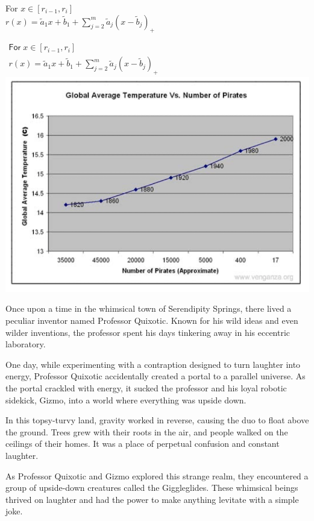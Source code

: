 \documentclass[10pt]{article}
\begin{document}
\begin{multicols*}{4}
For $x \in[r_{i-1},r_{i}]$ \\
$r(x)={\tilde{a}}_{1}x+{\tilde{b}}_{1}+\sum_{j=2}^{m}{\tilde{a}}_{j}(x-{\tilde{b}}_{j})_{+}$

\hrulefill

$\begin{array}{l}{{\mathsf{For}\;x\in[r_{i-1},r_{i}]}}\\ {{r(x)={\tilde{a}}_{1}x+{\tilde{b}}_{1}+\sum_{j=2}^{m}{\tilde{a}}_{j}(x-{\tilde{b}}_{j})_{+}}}\end{array}$\\
\includegraphics[width=\linewidth]{test_image}

Once upon a time in the whimsical town of Serendipity Springs, there lived a peculiar inventor named Professor Quixotic. Known for his wild ideas and even wilder inventions, the professor spent his days tinkering away in his eccentric laboratory.

\noindent\dotfill

One day, while experimenting with a contraption designed to turn laughter into energy, Professor Quixotic accidentally created a portal to a parallel universe. As the portal crackled with energy, it sucked the professor and his loyal robotic sidekick, Gizmo, into a world where everything was upside down.

In this topsy-turvy land, gravity worked in reverse, causing the duo to float above the ground. Trees grew with their roots in the air, and people walked on the ceilings of their homes. It was a place of perpetual confusion and constant laughter.

As Professor Quixotic and Gizmo explored this strange realm, they encountered a group of upside-down creatures called the Giggleglides. These whimsical beings thrived on laughter and had the power to make anything levitate with a simple joke.


\end{multicols*}
\end{document}
